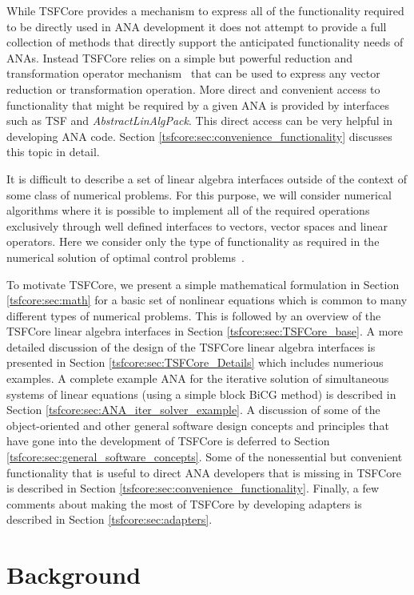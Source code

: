 \documentclass[10pt,fleqn]{article}
\begin{document}
While TSFCore provides a mechanism to express 
all of the functionality required to be directly used in ANA
development it does not attempt to provide a full collection of 
methods that directly support the anticipated functionality
needs of ANAs.  Instead TSFCore relies on a simple but powerful 
reduction and transformation operator mechanism~\cite{ref:rtop_toms}
that can be used to express any vector reduction or transformation 
operation.  More direct and convenient access to functionality that might be 
required by a given ANA is 
provided by interfaces such as TSF and \textit{AbstractLinAlgPack}. 
This direct access can be very helpful in developing ANA code.
Section \ref{tsfcore:sec:convenience_functionality} discusses this topic
in detail.

It is difficult to describe a set of linear algebra interfaces outside
of the context of some class of numerical problems.  For this purpose,
we will consider numerical algorithms where it is possible to implement
all of the required operations exclusively through well defined interfaces
to vectors, vector spaces and linear operators.  Here we consider
only the type of functionality as required in the numerical solution
of optimal control problems~\cite{ref:opt_ctrl_itfc}.

To motivate TSFCore, we present a simple mathematical formulation in
Section \ref{tsfcore:sec:math} for a basic set of nonlinear equations
which is common to many different types of numerical problems.  This
is followed by an overview of the TSFCore linear algebra interfaces in
Section \ref{tsfcore:sec:TSFCore_base}.  A more detailed discussion of
the design of the TSFCore linear algebra interfaces is presented in
Section \ref{tsfcore:sec:TSFCore_Details} which includes numerious
examples.  A complete example ANA for the iterative solution of
simultaneous systems of linear equations (using a simple block BiCG
method) is described in Section
\ref{tsfcore:sec:ANA_iter_solver_example}.  A discussion of some of the
object-oriented and other general software design concepts and
principles that have gone into the development of TSFCore is deferred
to Section \ref{tsfcore:sec:general_software_concepts}.  Some of the
nonessential but convenient functionality that is useful to direct ANA
developers that is missing in TSFCore is described in Section
\ref{tsfcore:sec:convenience_functionality}. Finally, a few comments
about making the most of TSFCore by developing adapters is described in
Section \ref{tsfcore:sec:adapters}.

%
\section{Background}
\label{tsfcore:sec:background}
%
\end{document}
